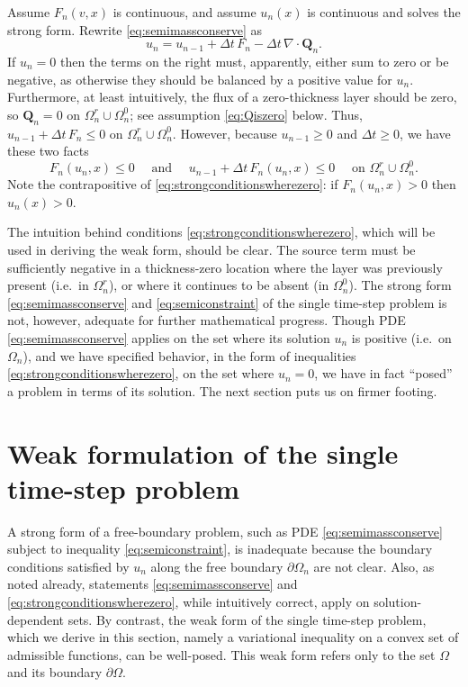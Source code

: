 \documentclass[final,leqno,onefignum,onetabnum]{siamltex1213bueler}
\newcommand\bQ{\mathbf{Q}}
\newcommand{\Div}{\nabla\cdot}
\begin{document}
Assume $F_n(v,x)$ is continuous, and assume $u_n(x)$ is continuous and solves the strong form.  Rewrite \eqref{eq:semimassconserve} as
    $$u_n = u_{n-1} + \Delta t\, F_n - \Delta t\, \Div \bQ_n.$$
If $u_n=0$ then the terms on the right must, apparently, either sum to zero or be negative, as otherwise they should be balanced by a positive value for $u_n$.  Furthermore, at least intuitively, the flux of a zero-thickness layer should be zero, so $\bQ_n=0$ on $\Omega_n^r \cup \Omega_n^0$; see assumption \eqref{eq:Qiszero} below.  Thus, $u_{n-1}+\Delta t\, F_n \le 0$ on $\Omega_n^r \cup \Omega_n^0$.  However, because $u_{n-1}\ge 0$ and $\Delta t\ge 0$, we have these two facts
\begin{equation}
F_n(u_n,x) \le 0 \quad \text{ and } \quad u_{n-1} + \Delta t\, F_n(u_n,x) \le 0 \quad \text{ on } \Omega_n^r \cup \Omega_n^0. \label{eq:strongconditionswherezero}
\end{equation}
Note the contrapositive of \eqref{eq:strongconditionswherezero}: if $F_n(u_n,x)>0$ then $u_n(x)>0$.

The intuition behind conditions \eqref{eq:strongconditionswherezero}, which will be used in deriving the weak form, should be clear.  The source term must be sufficiently negative in a thickness-zero location where the layer was previously present (i.e.~in $\Omega_n^r$), or where it continues to be absent (in $\Omega_n^0$).  The strong form \eqref{eq:semimassconserve} and \eqref{eq:semiconstraint} of the single time-step problem is not, however, adequate for further mathematical progress.  Though PDE \eqref{eq:semimassconserve} applies on the set where its solution $u_n$ is positive (i.e.~on $\Omega_n$), and we have specified behavior, in the form of inequalities \eqref{eq:strongconditionswherezero}, on the set where $u_n=0$, we have in fact ``posed'' a problem in terms of its solution.  The next section puts us on firmer footing.


\section{Weak formulation of the single time-step problem}  \label{sec:weakform}

A strong form of a free-boundary problem, such as PDE \eqref{eq:semimassconserve} subject to inequality \eqref{eq:semiconstraint}, is inadequate because the boundary conditions satisfied by $u_n$ along the free boundary $\partial\Omega_n$ are not clear.  Also, as noted already, statements \eqref{eq:semimassconserve} and \eqref{eq:strongconditionswherezero}, while intuitively correct, apply on solution-dependent sets.  By contrast, the weak form of the single time-step problem, which we derive in this section, namely a variational inequality \cite{Friedman,KinderlehrerStampacchia} on a convex set of admissible functions, can be well-posed.  This weak form refers only to the set $\Omega$ and its boundary $\partial\Omega$.
\end{document}
